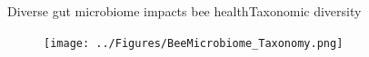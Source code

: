 \documentclass{beamer}
\begin{document}
\begin{frame}{Diverse gut microbiome impacts bee health}{Taxonomic diversity}
    \begin{figure}
        \texttt{[image: ../Figures/BeeMicrobiome\_Taxonomy.png]}
    \end{figure}
\end{frame}
\end{document}
